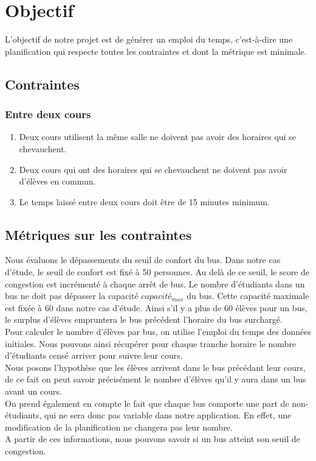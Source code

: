 \documentclass[a4paper,11pt]{article}
\begin{document}
\section{Objectif}
	L'objectif de notre projet est de générer un emploi du temps, c'est-à-dire une planification qui respecte toutes les contraintes et dont la métrique est minimale.
	\subsection{Contraintes}
		\subsubsection{Entre deux cours}
			\begin{enumerate}
				\item Deux cours utilisent la même salle ne doivent pas avoir des horaires qui se chevauchent.
				\item Deux cours qui ont des horaires qui se chevauchent ne doivent pas avoir d'élèves en commun.
				\item Le temps laissé entre deux cours doit être de 15 minutes minimum.
			\end{enumerate}
	
	\subsection{Métriques sur les contraintes}
		Nous évaluons le dépassements du seuil de confort du bus. Dans notre cas d'étude, le seuil de confort est fixé à 50 personnes. Au delà de ce seuil, le score de congestion est incrémenté à chaque arrêt de bus.
		Le nombre d'étudiants dans un bus ne doit pas dépasser la capacité $capacité_{max}$ du bus. Cette capacité maximale est fixée à 60 dans notre cas d'étude. Ainsi s'il y a plus de 60 élèves pour un bus, le surplus d'élèves empruntera le bus précédent l'horaire du bus surchargé.\\
		Pour calculer le nombre d'élèves par bus, on utilise l'emploi du temps des données initiales. Nous pouvons ainsi récupérer pour chaque tranche horaire le nombre d'étudiants censé arriver pour suivre leur cours.\\
		Nous posons l'hypothèse que les élèves arrivent dans le bus précédant leur cours, de ce fait on peut savoir précisément le nombre d'élèves qu'il y aura dans un bus avant un cours.\\
		On prend également en compte le fait que chaque bus comporte une part de non-étudiants, qui ne sera donc pas variable dans notre application. En effet, une modification de la planification ne changera pas leur nombre.\\
		A partir de ces informations, nous pouvons savoir si un bus atteint son seuil de congestion.
		
\end{document}
